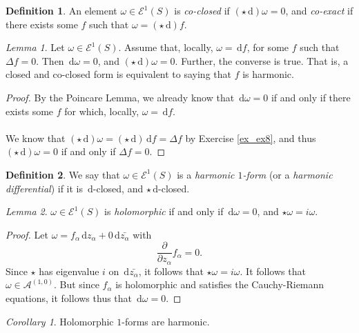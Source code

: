 \documentclass[a4paper]{report}
\theoremstyle{definition}
\newtheorem{definition}{Definition}
\theoremstyle{remark}
\theoremstyle{proposition}
\theoremstyle{conjecture}
\theoremstyle{lemma}
\newtheorem{lemma}{Lemma}
\theoremstyle{corollary}
\newtheorem{corollary}{Corollary}
\theoremstyle{exercise}
\theoremstyle{example}
\newcommand{\mcal}{\mathcal}
\newcommand{\diff}{\,\mathrm{d}}
\begin{document}
\begin{definition}
    An element $\omega \in \mcal{E}^1(S)$ is \emph{co-closed} if 
    $(\star\diff)\omega = 0$, and \emph{co-exact} if there exists
    some $f$ such that $\omega = (\star\diff)f$.
\end{definition}

\begin{lemma}\label{lem_lemma9}
    Let $\omega \in \mcal{E}^1(S)$. Assume that, locally, $\omega = \diff f$,
    for some $f$ such that $\Delta f = 0$. Then $\diff \omega = 0$, 
    and $(\star \diff)\omega = 0$. Further, the converse is true. 
    That is, a closed and co-closed form is equivalent to 
    saying that $f$ is harmonic.
\end{lemma}

\begin{proof}
    By the Poincare Lemma, we already know that $\diff \omega = 0$ 
    if and only if there exists some $f$ for which, locally,
    $\omega = \diff f$.\\\\
    We know that $(\star\diff)\omega = (\star \diff)\diff f = \Delta f$ 
    by Exercise \ref{ex_ex8}, and thus 
    $(\star\diff)\omega = 0$ if and only if $\Delta f = 0$.
\end{proof}

\begin{definition}
    We say that $\omega \in \mcal{E}^1(S)$ is a \emph{harmonic $1$-form} 
    (or a \emph{harmonic differential}) if it is $\diff$-closed, and 
    $\star\diff$-closed.
\end{definition}

\begin{lemma}
    $\omega \in \mcal{E}^1(S)$ is \emph{holomorphic} if and only if $\diff \omega = 0$, and
    $\star \omega = i\omega$.
\end{lemma}

\begin{proof}
    Let $\omega = f_\alpha \diff z_\alpha + 0\diff\bar{z_\alpha}$
    with $$\frac{\partial}{\partial z_\alpha}f_\alpha = 0.$$
    Since $\star$ has eigenvalue $i$ on $\diff\bar{z_\alpha}$, it follows
    that $\star \omega = i\omega$. It follows
    that $\omega \in \mcal{A}^{(1,0)}$.  
    But since $f_\alpha$ is holomorphic and satisfies the Cauchy-Riemann equations,
    it follows thus that $\diff\omega = 0$.
\end{proof}

\begin{corollary}
    Holomorphic $1$-forms are harmonic.
\end{corollary}
\end{document}
